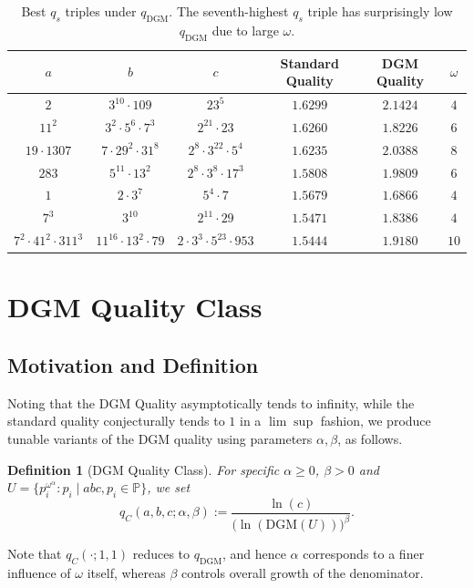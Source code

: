 \documentclass[11pt,letterpaper]{amsart}
\newtheorem{definition}[theorem]{Definition}
\begin{document}
\begin{table}[t]
    \centering
    \begin{tabular}{|c|c|c|c|c|c|}
        \hline
        $a$ & $b$ & $c$ & \textbf{Standard Quality} & \textbf{DGM Quality} & $\omega$ \\
        \hline
        $2$ & $3^{10} \cdot 109$ & $23^5$ & $1.6299$ & $2.1424$ & $4$ \\
        $11^2$ & $3^2 \cdot 5^6 \cdot 7^3$ & $2^{21} \cdot 23$ & $1.6260$ & $1.8226$ & $6$ \\
        $19 \cdot 1307$   & $7 \cdot 29^2 \cdot 31^8$ & $2^8 \cdot 3^{22} \cdot 5^4$ & $1.6235$ & $2.0388$ & $8$ \\
        $283$ & $5^{11} \cdot 13^{2}$ & $2^8 \cdot 3^8 \cdot 17^3$ & $1.5808$ & $1.9809$ & $6$ \\
        $1$ & $2 \cdot 3^7$ & $5^4 \cdot 7$ & $1.5679$ & $1.6866$ & $4$ \\
        $7^3$ & $3^{10}$ & $2^{11} \cdot 29$ & $1.5471$ & $1.8386$ & $4$ \\
        $7^2 \cdot 41^2 \cdot 311^3$ & $11^{16}\cdot 13^2 \cdot 79$ & $2\cdot3^3\cdot5^{23}\cdot953$ & $1.5444$ & $1.9180$ & $10$\\
        \hline
    \end{tabular}
    \caption{Best $q_s$ triples under $q_{\mathrm{DGM}}$. The seventh-highest $q_s$ triple has surprisingly low $q_{\mathrm{DGM}}$ due to large $\omega$.}
    \label{T_comparing_abc_to_dgm}
\end{table}

\vspace{-3mm}

\section{DGM Quality Class}
\label{S_DGM_Class}

\subsection{Motivation and Definition}

Noting that the DGM Quality asymptotically tends to infinity, while the standard quality conjecturally tends to $1$ in a $\lim\sup$ fashion, we produce tunable variants of the DGM quality using parameters $\alpha, \beta$, as follows.

\begin{definition}[DGM Quality Class]\label{D_DGM_class}
For specific $\alpha\ge 0$, $\beta>0$ and $U=\{p_i^{\omega^\alpha}:p_i \mid abc, p_i \in \mathbb{P}\}$, we set
\[
q_C(a,b,c;\alpha,\beta) := \frac{\ln(c)}{\bigl(\ln(\mathrm{DGM}(U))\bigr)^\beta}.
\]
\end{definition}
Note that $q_C(\cdot;1,1)$ reduces to $q_{\mathrm{DGM}}$, and hence $\alpha$ corresponds to a finer influence of $\omega$ itself, whereas $\beta$ controls overall growth of the denominator.
\end{document}
